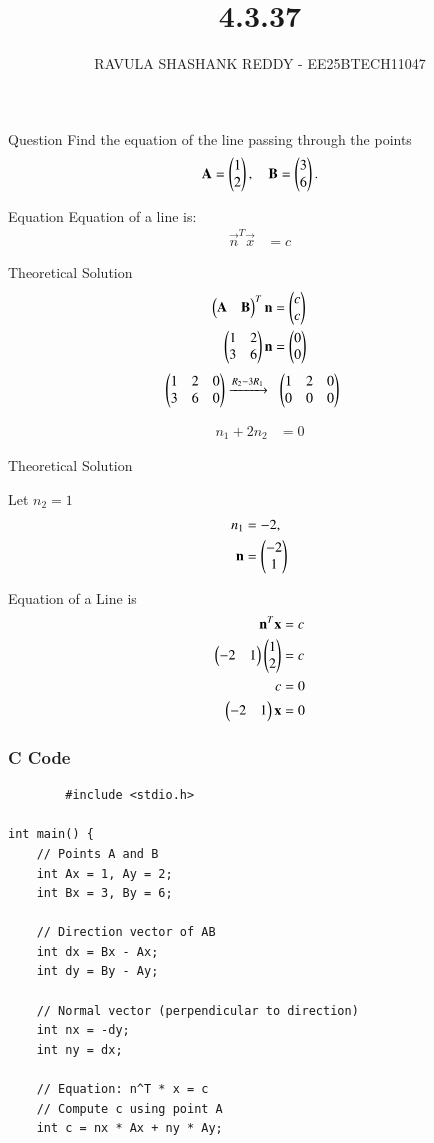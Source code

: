 \documentclass{beamer}
\title %
{4.3.37}
\author %
{RAVULA SHASHANK REDDY - EE25BTECH11047}
\begin{document}
	\frame{\titlepage}
	\begin{frame}{Question}
Find the equation of the line passing through the points  
\[
\mathbf{A} = \begin{pmatrix}1 \\ 2\end{pmatrix}, 
\quad 
\mathbf{B} = \begin{pmatrix}3 \\ 6\end{pmatrix}.
\]
\end{frame}
\begin{frame}{Equation}
Equation of a line is:
\begin{align*}
\vec{n}^T \vec{x} &= c 
    \end{align*}
\end{frame}
\begin{frame}{Theoretical Solution}
   \begin{align}
\begin{pmatrix}\mathbf{A}&\mathbf{B}\end{pmatrix}^T\mathbf{n} &= \begin{pmatrix}c\\c\end{pmatrix}\\
\begin{pmatrix}1 & 2 \\ 3 & 6\end{pmatrix}\mathbf{n} &= \begin{pmatrix}0 \\ 0\end{pmatrix} 
\end{align}
\begin{align}
\begin{pmatrix}1 & 2 & 0 \\ 3 & 6 & 0\end{pmatrix} & 
\xrightarrow{R_2 - 3R_1}\;\;
\begin{pmatrix}1 & 2 & 0 \\ 0 & 0 & 0\end{pmatrix} 
\end{align}

\begin{align}
n_1 + 2n_2 &= 0 
\end{align}
\end{frame}
\begin{frame}{Theoretical Solution}

Let $n_2=1$
\begin{align}
n_1 &= -2, \\
\mathbf{n} &= \begin{pmatrix}-2 \\ 1\end{pmatrix}
\end{align}

Equation of a Line is
\begin{align}
\mathbf{n}^T \mathbf{x} &= c \\
\begin{pmatrix}-2 & 1\end{pmatrix}\begin{pmatrix}1 \\ 2\end{pmatrix} &= c \\
c &= 0 \\
\begin{pmatrix}-2 & 1\end{pmatrix}\mathbf{x} &= 0 
\end{align}
\end{frame}
\begin{frame}[fragile]
    \frametitle{C Code}
    \begin{lstlisting}
        #include <stdio.h>

int main() {
    // Points A and B
    int Ax = 1, Ay = 2;
    int Bx = 3, By = 6;

    // Direction vector of AB
    int dx = Bx - Ax;
    int dy = By - Ay;

    // Normal vector (perpendicular to direction)
    int nx = -dy;
    int ny = dx;

    // Equation: n^T * x = c
    // Compute c using point A
    int c = nx * Ax + ny * Ay;
\end{lstlisting}
\end{frame}
\end{document}
